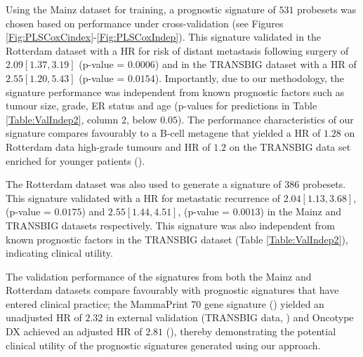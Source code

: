 \documentclass[letterpaper,12pt]{article}
\begin{document}
Using the Mainz dataset for training, a prognostic signature of $531$ probesets was chosen based on performance under cross-validation (see Figures \ref{Fig:PLSCoxCindex}-\ref{Fig:PLSCoxIndep}). This signature validated in the Rotterdam dataset with a HR for risk of distant metastasis following surgery of $2.09 [1.37, 3.19]$ (p-value = $0.0006$) and in the TRANSBIG dataset with a HR of $2.55 [1.20, 5.43]$ (p-value = $0.0154$). Importantly, due to our methodology, the signature performance was independent from known prognostic factors such as tumour size, grade, ER status and age (p-values for predictions in Table \ref{Table:ValIndep2}, column 2, below $0.05$). The performance characteristics of our signature compares favourably to a B-cell metagene that yielded a HR of $1.28$ on Rotterdam data high-grade tumours and HR of $1.2$ on the TRANSBIG data set enriched for younger patients (\citet{Schmidt:08}). 

The Rotterdam dataset was also used to generate a signature of $386$ probesets. This signature validated with a HR for metastatic recurrence of $2.04 [1.13, 3.68]$, (p-value = $0.0175$) and $2.55 [1.44, 4.51]$, (p-value = $0.0013$) in the Mainz and TRANSBIG datasets respectively. This signature was also independent from known prognostic factors in the TRANSBIG dataset (Table \ref{Table:ValIndep2}), indicating clinical utility.

The validation performance of the signatures from both the Mainz and Rotterdam datasets compare favourably with prognostic signatures that have entered clinical practice; the MammaPrint 70 gene signature (\citet{Veer:02}) yielded an unadjusted HR of $2.32$ in external validation (TRANSBIG data, \citet{Buyse:06}) and Oncotype DX achieved an adjusted HR of $2.81$ (\citet{Paik:04}), thereby demonstrating the potential clinical utility of the prognostic signatures generated using our approach.
\end{document}
